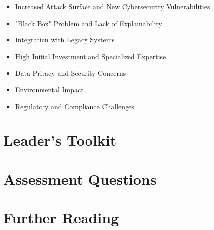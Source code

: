 \begin{itemize}
    \item Increased Attack Surface and New Cybersecurity Vulnerabilities
    \item "Black Box" Problem and Lack of Explainability
    \item Integration with Legacy Systems
    \item High Initial Investment and Specialized Expertise
    \item Data Privacy and Security Concerns
    \item Environmental Impact
    \item Regulatory and Compliance Challenges
\end{itemize}




\section{Leader's Toolkit}
\label{sec:ai_revolution_leaders_toolkit}

\section{Assessment Questions}
\label{sec:ai_revolution_assessment_questions}

\section{Further Reading}
\label{sec:ai_revolution_further_reading}